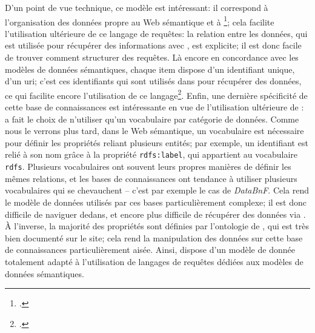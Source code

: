 D'un point de vue technique, ce modèle est intéressant: il correspond à l'organisation des données propre au Web sémantique et à \sparql{}\footcite[p. 51-52]{mika_introducing_2014}; cela facilite l'utilisation ultérieure de ce langage de requêtes: la relation entre les données, qui est utilisée pour récupérer des informations avec \sparql{}, est explicite; il est donc facile de trouver comment structurer des requêtes. Là encore en concordance avec les modèles de données sémantiques, chaque item dispose d'un identifiant unique, d'un \gls{uri}; c'est ces identifiants qui sont utilisés dans \sparql{} pour récupérer des données, ce qui facilite encore l'utilisation de ce langage\footcite[p. 56]{mika_introducing_2014}. Enfin, une dernière spécificité de cette base de connaissances est intéressante en vue de l'utilisation ultérieure de \sparql{}: \wkd{} a fait le choix de n'utiliser qu'un vocabulaire par catégorie de données. Comme nous le verrons plus tard, dans le Web sémantique, un vocabulaire est nécessaire pour définir les propriétés reliant plusieurs entités; par exemple, un identifiant est relié à son nom grâce à la propriété \texttt{rdfs:label}, qui appartient au vocabulaire \texttt{rdfs}. Plusieurs vocabulaires ont souvent leurs propres manières de définir les mêmes relations, et les bases de connaissances ont tendance à utiliser plusieurs vocabulaires qui se chevauchent -- c'est par exemple le cas de \textit{DataBnF}. Cela rend le modèle de données utilisés par ces bases particulièrement complexe; il est donc difficile de naviguer dedans, et encore plus difficile de récupérer des données via \sparql{}. À l'inverse, la majorité des propriétés sont définies par l'ontologie de \wkd{}, qui est très bien documenté sur le site; cela rend la manipulation des données sur cette base de connaissances particulièrement aisée. Ainsi, \wkd{} dispose d'un modèle de donnée totalement adapté à l'utilisation de langages de requêtes dédiées aux modèles de données sémantiques.

